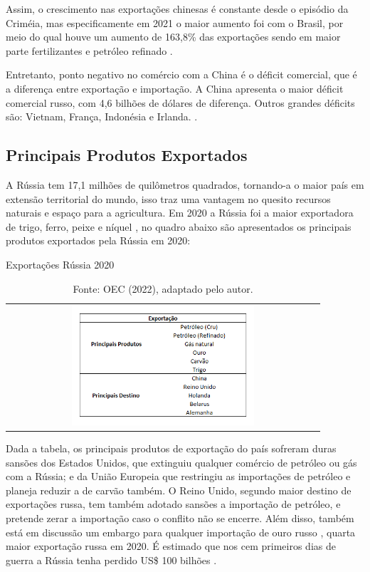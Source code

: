 \documentclass[12pt]{article}
\begin{document}
Assim, o crescimento nas exportações chinesas é constante desde o episódio da Criméia, mas especificamente em 2021 o maior aumento foi com o Brasil, por meio do qual houve um aumento de 163,8\% das exportações \cite{workmanRussia22} sendo em maior parte fertilizantes e petróleo refinado \cite{oecRussia22}.

Entretanto, ponto negativo no comércio com a China é o déficit comercial, que é a diferença entre exportação e importação. A China apresenta o maior déficit comercial russo, com 4,6 bilhões de dólares de diferença. Outros grandes déficits são: Vietnam, França, Indonésia e Irlanda. \cite{oecRussia22}.

\subsection{Principais Produtos Exportados}

A Rússia tem 17,1 milhões de quilômetros quadrados, tornando-a o maior país em extensão territorial do mundo, isso traz uma vantagem no quesito recursos naturais e espaço para a agricultura. Em 2020 a Rússia foi a maior exportadora de trigo, ferro, peixe e níquel \cite{oecRussia22}, no quadro abaixo são apresentados os principais produtos exportados pela Rússia em 2020:

\begin{table}[H]
    \begin{center}
        \caption{Exportações Rússia 2020}
        \begin{tabular}{c}
            \includegraphics[width=0.6\textwidth]{exp rus.png}
        \end{tabular}
        \label{exprus}
        \caption*{Fonte: OEC (2022), adaptado pelo autor.}
    \end{center}
\end{table}

Dada a tabela, os principais produtos de exportação do país sofreram duras sansões dos Estados Unidos, que extinguiu qualquer comércio de petróleo ou gás com a Rússia; e da União Europeia que restringiu as importações de petróleo e planeja reduzir a de carvão também. O Reino Unido, segundo maior destino de exportações russa, tem também adotado sansões a importação de petróleo, e pretende zerar a importação caso o conflito não se encerre. Além disso, também está em discussão um embargo para qualquer importação de ouro russo \cite{russianGold22}, quarta maior exportação russa em 2020. É estimado que nos cem primeiros dias de guerra a Rússia tenha perdido US\$ 100 bilhões \cite{sanctionsRussiaBBC22}. 
\end{document}
